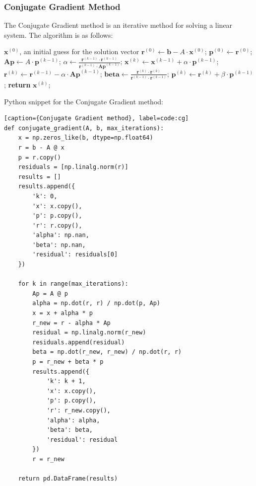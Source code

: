 \documentclass[10pt]{article}
\begin{document}
\subsubsection{Conjugate Gradient Method}
The Conjugate Gradient method is an iterative method for solving a linear system. The algorithm is as follows:
\begin{algorithm}[H]
\caption{Conjugate Gradient Method}
\begin{algorithmic}
\State $\mathbf{x}^{(0)}$, an initial guess for the solution vector\;
\State $\mathbf{r}^{(0)} \gets \mathbf{b} - A \cdot \mathbf{x}^{(0)}$;
\State $\mathbf{p}^{(0)} \gets \mathbf{r}^{(0)}$;
    \State $\mathbf{Ap} \gets A \cdot \mathbf{p}^{(k-1)}$;
    \State $\alpha \gets \frac{\mathbf{r}^{(k-1)} \cdot \mathbf{r}^{(k-1)}}{\mathbf{r}^{(k-1)} \cdot \mathbf{Ap}^{(k-1)}}$;
    \State $\mathbf{x}^{(k)} \gets \mathbf{x}^{(k-1)} + \alpha \cdot \mathbf{p}^{(k-1)}$;
    \State $\mathbf{r}^{(k)} \gets \mathbf{r}^{(k-1)} - \alpha \cdot \mathbf{Ap}^{(k-1)}$;
    \State $\mathbf{beta} \gets \frac{\mathbf{r}^{(k)} \cdot \mathbf{r}^{(k)}}{\mathbf{r}^{(k-1)} \cdot \mathbf{r}^{(k-1)}}$;
    \State $\mathbf{p}^{(k)} \gets \mathbf{r}^{(k)} + \beta \cdot \mathbf{p}^{(k-1)}$;
\EndFor
\State \textbf{return} $\mathbf{x}^{(k)}$;
\end{algorithmic}
\end{algorithm}

Python snippet for the Conjugate Gradient method:
\begin{lstlisting}[style=custompython][caption={Conjugate Gradient method}, label=code:cg]
def conjugate_gradient(A, b, max_iterations):
    x = np.zeros_like(b, dtype=np.float64)
    r = b - A @ x
    p = r.copy()
    residuals = [np.linalg.norm(r)]
    results = []
    results.append({
        'k': 0,
        'x': x.copy(),
        'p': p.copy(),
        'r': r.copy(),
        'alpha': np.nan,
        'beta': np.nan,
        'residual': residuals[0]
    })
    
    for k in range(max_iterations):
        Ap = A @ p
        alpha = np.dot(r, r) / np.dot(p, Ap)
        x = x + alpha * p
        r_new = r - alpha * Ap
        residual = np.linalg.norm(r_new)
        residuals.append(residual)
        beta = np.dot(r_new, r_new) / np.dot(r, r)
        p = r_new + beta * p
        results.append({
            'k': k + 1,
            'x': x.copy(),
            'p': p.copy(),
            'r': r_new.copy(),
            'alpha': alpha,
            'beta': beta,
            'residual': residual
        })
        r = r_new
    
    return pd.DataFrame(results)
\end{lstlisting}
\end{document}
